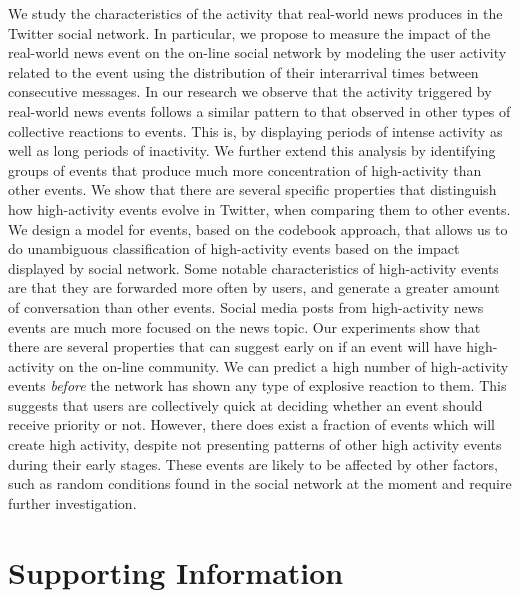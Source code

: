 \documentclass[10pt,letterpaper]{article}
\begin{document}
We study the characteristics of the activity that real-world news produces
in the Twitter social network. In particular, we propose to measure the impact of the
real-world news event on the on-line social network by modeling the user
activity related to the event using the distribution of their
interarrival times between consecutive messages. In our research we observe
that the activity triggered by real-world news events follows a similar
pattern to that observed in other types of collective reactions to events.
This is, by displaying periods of intense activity as well as long periods of
inactivity. We further extend this analysis by identifying groups of events
that produce much more concentration of high-activity than other events. 
We show that there are several specific properties that distinguish how
high-activity events evolve in Twitter, when comparing them to other
events. We design a model for events, based on the codebook approach, that allows us to do
unambiguous classification of high-activity events based on the impact
displayed by social network. %
Some notable
characteristics of high-activity events are that they are forwarded more
often by users, and generate a greater amount of conversation than
other events.  Social media posts from high-activity news events are
much more focused on the news topic. Our experiments show that there
are several properties that can suggest early on if an event will have
high-activity on the on-line community.  We can predict a high number of
high-activity events {\em before} the network has shown any type of
explosive reaction to them. %
This suggests that users are collectively quick at deciding whether an
event should receive priority or not.  However, there does exist a fraction of
events which will create high activity, despite not presenting
patterns of other high activity events during their early stages.  These
events are likely to be affected by other factors, such as random
conditions found in the social network at the moment and require
further investigation.
\nolinenumbers





\section*{Supporting Information}
\end{document}
